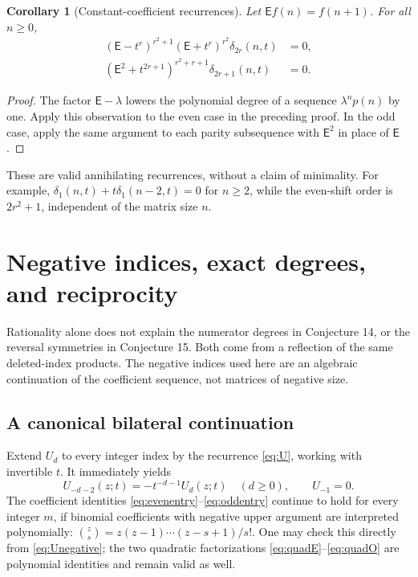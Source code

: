 \documentclass[11pt,letterpaper]{article}
\numberwithin{equation}{section}
\newtheorem{corollary}[theorem]{Corollary}
\theoremstyle{definition}
\begin{document}
\begin{corollary}[Constant-coefficient recurrences]\label{cor:recurrence}
Let \(\mathsf E f(n)=f(n+1)\). For all \(n\ge0\),
\begin{align}
 (\mathsf E-t^r)^{r^2+1}(\mathsf E+t^r)^{r^2}
       \delta_{2r}(n,t)&=0,\label{eq:receven}\\
 (\mathsf E^2+t^{2r+1})^{r^2+r+1}
       \delta_{2r+1}(n,t)&=0.\label{eq:recodd}
\end{align}
\end{corollary}
\begin{proof}
The factor \(\mathsf E-\lambda\) lowers the polynomial degree of a
sequence \(\lambda^np(n)\) by one. Apply this observation to the even
case in the preceding proof. In the odd case, apply the same argument
to each parity subsequence with \(\mathsf E^2\) in place of
\(\mathsf E\).
\end{proof}
These are valid annihilating recurrences, without a claim of minimality.
For example, \(\delta_1(n,t)+t\delta_1(n-2,t)=0\) for \(n\ge2\),
while the even-shift order is \(2r^2+1\), independent of the matrix
size \(n\).

\section{Negative indices, exact degrees, and reciprocity}\label{sec:reciprocity}
Rationality alone does not explain the numerator degrees in Conjecture 14,
or the reversal symmetries in Conjecture 15. Both come from a reflection
of the same deleted-index products. The negative indices used here are
an algebraic continuation of the coefficient sequence, not matrices of
negative size.

\subsection{A canonical bilateral continuation}
Extend \(U_d\) to every integer index by the recurrence
\eqref{eq:U}, working with invertible \(t\). It immediately yields
\begin{equation}\label{eq:Unegative}
 U_{-d-2}(z;t)=-t^{-d-1}U_d(z;t)\quad(d\ge0),
 \qquad U_{-1}=0.
\end{equation}
The coefficient identities \eqref{eq:evenentry}--\eqref{eq:oddentry}
continue to hold for every integer \(m\), if binomial coefficients
with negative upper argument are interpreted polynomially:
\(\binom zs=z(z-1)\cdots(z-s+1)/s!\).
One may check this directly from \eqref{eq:Unegative}; the two
quadratic factorizations \eqref{eq:quadE}--\eqref{eq:quadO} are
polynomial identities and remain valid as well.
\end{document}
